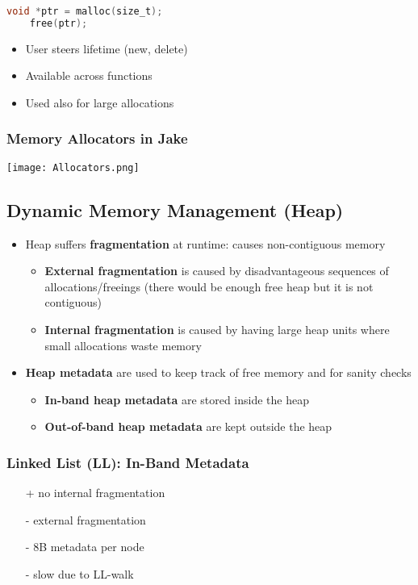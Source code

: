 \begin{lstlisting}[language={C}]
    void *ptr = malloc(size_t);
    free(ptr);                  
\end{lstlisting}
\begin{itemize}
    \item User steers lifetime (new, delete)
    \item Available across functions
    \item Used also for large allocations
\end{itemize}

\subsubsection{Memory Allocators in Jake}
\begin{center}
    \texttt{[image: Allocators.png]}
\end{center}

\subsection{Dynamic Memory Management (Heap)}
\begin{itemize}
    \item Heap suffers \textbf{fragmentation} at runtime: causes non-contiguous memory
          \noindent\begin{itemize}
              \item \textbf{External fragmentation} is caused by disadvantageous sequences of allocations/freeings (there would be enough free heap but it is not contiguous)
              \item \textbf{Internal fragmentation} is caused by having large heap units where small allocations waste memory
          \end{itemize}
    \item \textbf{Heap metadata} are used to keep track of free memory and for sanity checks
          \noindent\begin{itemize}
              \item \textbf{In-band heap metadata} are stored inside the heap
              \item \textbf{Out-of-band heap metadata} are kept outside the heap
          \end{itemize}
\end{itemize}

\subsubsection{Linked List (LL): In-Band Metadata}
\begin{itemize}
    \item [+] no internal fragmentation 
    \item [-] external fragmentation
    \item [-] 8B metadata per node
    \item [-] slow  due to LL-walk
\end{itemize}

